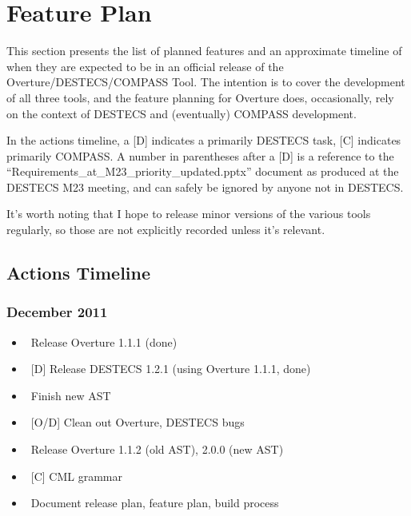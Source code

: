 \documentclass{overturerep}
\newenvironment{denseitemize}
  {\begin{itemize}\setlength{\itemsep}{0pt}\setlength{\parskip}{0pt}\setlength{\parsep}{0pt}}
  {\end{itemize}}
\newcommand{\developer}[1]{{\scriptsize \fbox{#1}}}
\begin{document}

\chapter{Feature Plan}

  This section presents the list of planned features and an
  approximate timeline of when they are expected to be in an official
  release of the Overture/DESTECS/COMPASS Tool.  The intention is to
  cover the development of all three tools, and the feature planning
  for Overture does, occasionally, rely on the context of DESTECS and
  (eventually) COMPASS development.

  In the actions timeline, a [D] indicates a primarily DESTECS task,
  [C] indicates primarily COMPASS.  A number in parentheses after a
  [D] is a reference to the
  \mbox{``Requirements\_at\_M23\_priority\_updated.pptx''} document as
  produced at the DESTECS M23 meeting, and can safely be ignored by
  anyone not in DESTECS.

  It's worth noting that I hope to release minor versions of the
  various tools regularly, so those are not explicitly recorded unless
  it's relevant.

\section{Actions Timeline}

\subsection{December 2011}
\begin{denseitemize}
\item\ Release Overture 1.1.1 (done)
\item\ [D] Release DESTECS 1.2.1 (using Overture 1.1.1, done)
\item\ Finish new AST \developer{KEL, ARI, AKM, RAL}
\item\ [O/D] Clean out Overture, DESTECS bugs \developer{ARI}
\item\ Release Overture 1.1.2 (old AST), 2.0.0 (new AST)
\item\ [C] CML grammar \developer{JWC}
\item\ Document release plan, feature plan, build process \developer{JWC}
\end{denseitemize}
\end{document}
